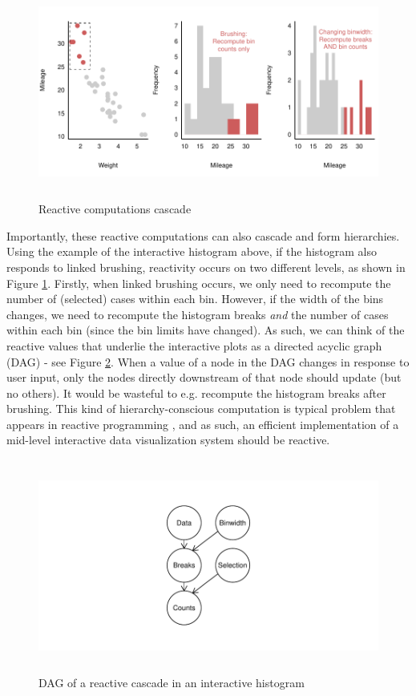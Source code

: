 \documentclass[12pt,a4paper]{article}
\begin{document}
\begin{figure}[H]
\centering
\includegraphics[height=70mm]{./figure03.pdf}
\caption{Reactive computations cascade}
\label{fig:reactivecascade}
\end{figure}

Importantly, these reactive computations can also cascade and form hierarchies. Using the example of the interactive histogram above, if the histogram also responds to linked brushing, reactivity occurs on two different levels, as shown in Figure \ref{fig:reactivecascade}. Firstly, when linked brushing occurs, we only need to recompute the number of (selected) cases within each bin. However, if the width of the bins changes, we need to recompute the histogram breaks \textit{and} the number of cases within each bin (since the bin limits have changed). As such, we can think of the reactive values that underlie the interactive plots as a directed acyclic graph (DAG) - see Figure \ref{fig:dag}. When a value of a node in the DAG changes in response to user input, only the nodes directly downstream of that node should update (but no others). It would be wasteful to e.g. recompute the histogram breaks after brushing. This kind of hierarchy-conscious computation is typical problem that appears in reactive programming \citep[see e.g.][]{doglio2016}, and as such, an efficient implementation of a mid-level interactive data visualization system should be reactive.            

\begin{figure}[H]
\centering
\includegraphics[height=70mm]{./figure04.pdf}
\caption{DAG of a reactive cascade in an interactive histogram}
\label{fig:dag}
\end{figure}
\end{document}
